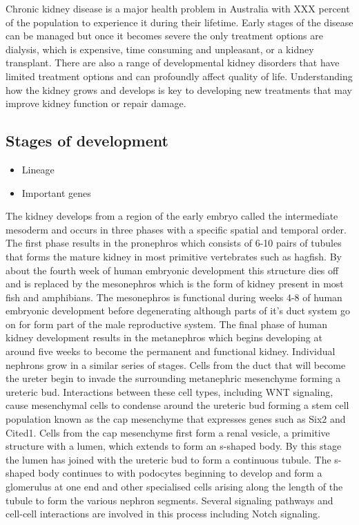 \documentclass[11pt,a4paper,titlepage,twoside,openright]{style/unimelbthesis}
\theoremstyle{definition}
\theoremstyle{definition}
\theoremstyle{definition}
\theoremstyle{remark}
\begin{document}
\begin{mainmatter}
Chronic kidney disease is a major health problem in Australia with XXX percent of the population to experience it during their lifetime. Early stages of the disease can be managed but once it becomes severe the only treatment options are dialysis, which is expensive, time consuming and unpleasant, or a kidney transplant. There are also a range of developmental kidney disorders that have limited treatment options and can profoundly affect quality of life. Understanding how the kidney grows and develops is key to developing new treatments that may improve kidney function or repair damage.

\hypertarget{stages-of-development}{%
\subsection{Stages of development}\label{stages-of-development}}

\begin{itemize}
\tightlist
\item
  Lineage
\item
  Important genes
\end{itemize}

The kidney develops from a region of the early embryo called the intermediate mesoderm and occurs in three phases with a specific spatial and temporal order. The first phase results in the pronephros which consists of 6-10 pairs of tubules that forms the mature kidney in most primitive vertebrates such as hagfish. By about the fourth week of human embryonic development this structure dies off and is replaced by the mesonephros which is the form of kidney present in most fish and amphibians. The mesonephros is functional during weeks 4-8 of human embryonic development before degenerating although parts of it's duct system go on for form part of the male reproductive system. The final phase of human kidney development results in the metanephros which begins developing at around five weeks to become the permanent and functional kidney. Individual nephrons grow in a similar series of stages. Cells from the duct that will become the ureter begin to invade the surrounding metanephric mesenchyme forming a ureteric bud. Interactions between these cell types, including WNT signaling, cause mesenchymal cells to condense around the ureteric bud forming a stem cell population known as the cap mesenchyme that expresses genes such as Six2 and Cited1. Cells from the cap mesenchyme first form a renal vesicle, a primitive structure with a lumen, which extends to form an s-shaped body. By this stage the lumen has joined with the ureteric bud to form a continuous tubule. The s-shaped body continues to with podocytes beginning to develop and form a glomerulus at one end and other specialised cells arising along the length of the tubule to form the various nephron segments. Several signaling pathways and cell-cell interactions are involved in this process including Notch signaling.


\end{mainmatter}
\end{document}
